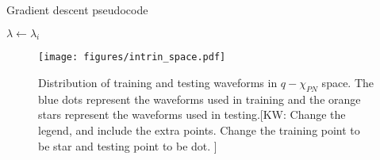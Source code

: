 \documentclass[twocolumn]{aastex631}
\newcommand{\kw}[1]{{\color{rb4}[KW: #1 ]}}
\begin{document}
\begin{algorithm}[t]
	\caption{Gradient descent pseudocode}
	\label{alg:gradient}
	    $\lambda\leftarrow\lambda_i$\\
	 \Return{$\lambda$}
\end{algorithm}

\begin{figure}[t]
	\centering
	\texttt{[image: figures/intrin\_space.pdf]}
	\caption{Distribution of training and testing waveforms in $q-\chi_{PN}$
	space. The blue dots represent the waveforms used in training and the orange
	stars represent the waveforms used in testing.\kw{Change the legend, and include the extra points. Change the training point to be star and testing point to be dot.}}
	\label{fig:intrin_space}
\end{figure}
\end{document}
